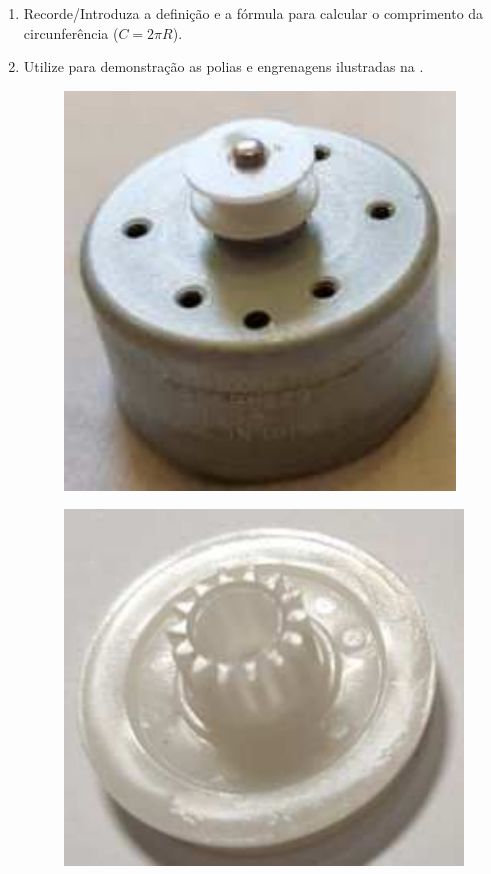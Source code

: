 \documentclass{textolivre}
\begin{document}
\begin{enumerate}
\item Recorde/Introduza a definição e a fórmula para calcular o comprimento da circunferência ($C = 2\pi R$).
\item Utilize para demonstração as polias e engrenagens ilustradas na .

    \begin{figure}[h!]
    \begin{minipage}{0.2\textwidth}
    \includegraphics[width=\linewidth]{figure-24.pdf}
    \label{fig17a}
    \end{minipage}
    \hfill
    \begin{minipage}{0.2\textwidth} 
    \includegraphics[width=\linewidth]{figure-25.pdf}

\end{minipage}
\end{figure}
\end{enumerate}
\end{document}
